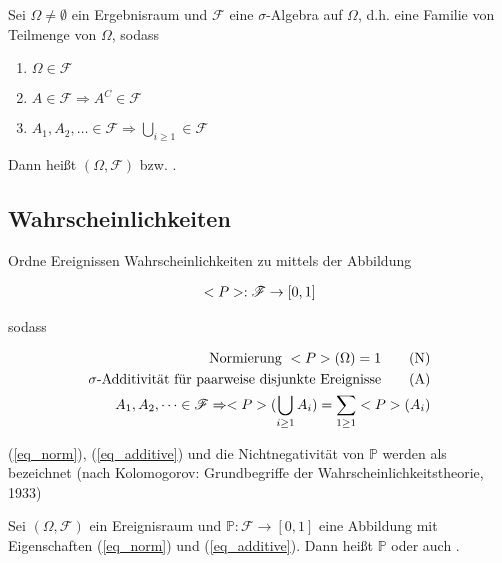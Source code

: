 \begin{definition}
	Sei $\Omega \neq \emptyset$ ein Ergebnisraum und $\mathscr{F}$ eine $\sigma$-Algebra auf $\Omega$, d.h. eine Familie von Teilmenge von $\Omega$, sodass
	\begin{enumerate}
		\item $\Omega \in \mathscr{F}$
		\item $A \in \mathscr{F} \Rightarrow A^C \in \mathscr{F}$
		\item $A_1, A_2, \dots \in \mathscr{F} \Rightarrow \bigcup_{i \ge 1} \in \mathscr{F}$
	\end{enumerate}
	Dann heißt $(\Omega, \mathscr{F})$  bzw. .
\end{definition}

\subsection*{Wahrscheinlichkeiten}

Ordne Ereignissen Wahrscheinlichkeiten zu mittels der Abbildung

\begin{align}
	\mathbb{P}: \mathscr{F} \to [0,1]\notag
\end{align}

sodass

\begin{align}
	\text{Normierung } \mathbb{P}(\Omega) = 1 \tag{N}\label{eq_norm}\\
	\sigma\text{-Additivität für paarweise disjunkte Ereignisse} \tag{A}\label{eq_additive}\\
	A_1, A_2, \dots \in \mathscr{F} \Rightarrow \mathbb{P}(\bigcup_{i \ge 1} A_i) = \sum_{1 \ge 1} \mathbb{P}(A_i)\notag
\end{align}

(\ref{eq_norm}), (\ref{eq_additive}) und die Nichtnegativität von $\mathbb{P}$ werden als  bezeichnet (nach Kolomogorov: Grundbegriffe der Wahrscheinlichkeitstheorie, 1933)

\begin{definition}
	Sei $(\Omega, \mathscr{F})$ ein Ereignisraum und $\mathbb{P}: \mathscr{F} \to [0,1]$ eine Abbildung mit Eigenschaften (\ref{eq_norm}) und (\ref{eq_additive}). Dann heißt $\mathbb{P}$  oder auch .
\end{definition}


